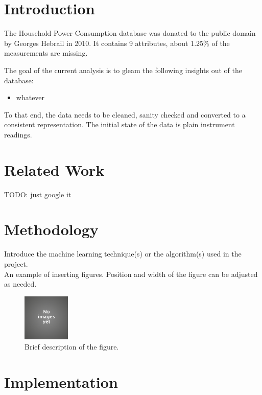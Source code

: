 \documentclass[11pt]{article}
\title{\MakeMeBlue{title?}}
\author{Miroslav Vitkov}
\date{\today}
\newcommand{\para}[0]{\par\vspace{0.5cm}}
\begin{document}
\maketitle

\section{Introduction}
The Household Power Consumption database was donated to the public domain by Georges Hebrail in 2010.
It contains 9 attributes, about 1.25\% of the measurements are missing.
\para
The goal of the current analysis is to gleam the following insights out of the database:
\begin{itemize}
    \item{whatever}
\end{itemize}
\para
To that end, the data needs to be cleaned, sanity checked and converted to a consistent representation.
The initial state of the data is plain instrument readings.

\section{Related Work}
TODO: just google it


\section{Methodology}
Introduce the machine learning technique(s) or the algorithm(s) used in the project. \\

An example of inserting figures. Position and width of the figure can be adjusted as needed.
\begin{figure}[!htp]        
  \centering
    \includegraphics[width=0.2\textwidth]{MyProject-KnowledgeDiscovery/image.jpg}
    \caption{Brief description of the figure.}
\end{figure}

\section{Implementation}
\end{document}
